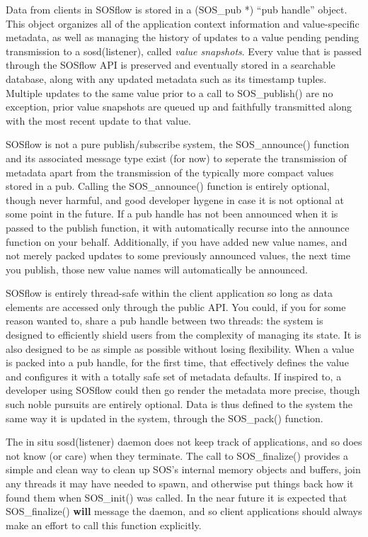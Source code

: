 Data from clients in SOSflow is stored in a (SOS\_pub *) ``pub handle''
object. This object organizes all of the application context
information and value-specific metadata, as well as managing the
history of updates to a value pending pending transmission to a
sosd(listener), called \textit{value snapshots}. Every value that is
passed through the SOSflow API is preserved and eventually stored in a
searchable database, along with any updated metadata such as its
timestamp tuples.  Multiple updates to the same value prior to a call
to SOS\_publish() are no exception, prior value snapshots are queued
up and faithfully transmitted along with the most recent update to
that value.

SOSflow is not a pure publish/subscribe system, the SOS\_announce()
function and its associated message type exist (for now) to seperate the
transmission of metadata apart from the transmission of the typically
more compact values stored in a pub.  Calling the SOS\_announce()
function is entirely optional, though never harmful, and good
developer hygene in case it is not optional at some point in the
future. If a pub handle has not been announced when it is passed to
the publish function, it with automatically recurse into the announce
function on your behalf.  Additionally, if you have added new value
names, and not merely packed updates to some previously announced
values, the next time you publish, those new value names will
automatically be announced.

SOSflow is entirely thread-safe within the client application so long
as data elements are accessed only through the public API. You could,
if you for some reason wanted to, share a pub handle between two
threads: the system is designed to efficiently shield users from the
complexity of managing its state.  It is also designed to be as simple
as possible without losing flexibility. When a value is packed into a
pub handle, for the first time, that effectively defines the value and
configures it with a totally safe set of metadata defaults. If inspired
to, a developer using SOSflow could then go render the metadata more
precise, though such noble pursuits are entirely optional. Data is
thus defined to the system the same way it is updated in the system,
through the SOS\_pack() function.

The in situ sosd(listener) daemon does not keep track of applications,
and so does not know (or care) when they terminate. The call to SOS\_finalize()
provides a simple and clean way to clean up SOS's internal memory objects
and buffers, join any threads it may have needed to spawn, and otherwise
put things back how it found them when SOS\_init() was called. In the
near future it is expected that SOS\_finalize() \textbf{will} message the
daemon, and so client applications should always make an effort to call
this function explicitly.


